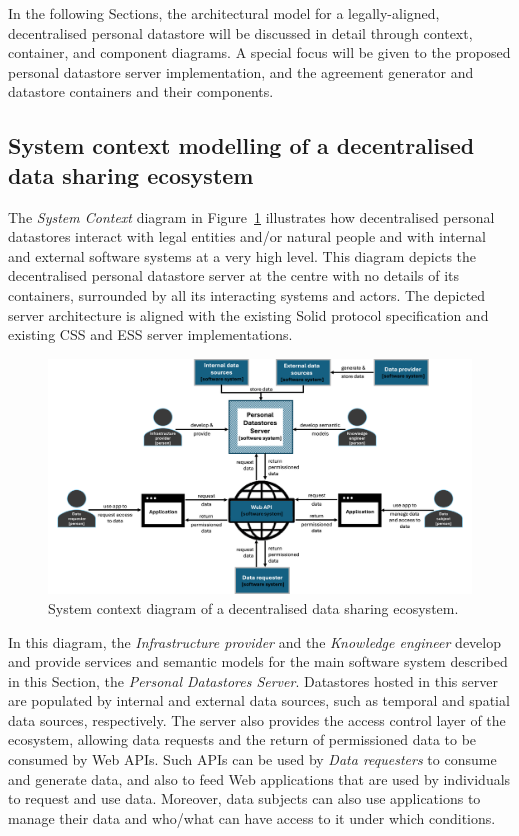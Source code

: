 In the following Sections, the architectural model for a legally-aligned, decentralised personal datastore will be discussed in detail through context, container, and component diagrams.
A special focus will be given to the proposed personal datastore server implementation, and the agreement generator and datastore containers and their components. 

\subsection{System context modelling of a decentralised data sharing ecosystem}
\label{sec:c4_context}

The \textit{System Context} diagram in Figure~\ref{fig:c4-context} illustrates how decentralised personal datastores interact with legal entities and/or natural people and with internal and external software systems at a very high level.
This diagram depicts the decentralised personal datastore server at the centre with no details of its containers, surrounded by all its interacting systems and actors.
The depicted server architecture is aligned with the existing Solid protocol specification \citep{capadisli_solid_2022} and existing CSS and ESS server implementations.

\begin{figure}[ht]
    \centering
    \includegraphics[width=1\linewidth]{figures//chapter-6/system-context-diagram.png}
    \caption{System context diagram of a decentralised data sharing ecosystem.}
    \label{fig:c4-context}
\end{figure}

In this diagram, the \textit{Infrastructure provider} and the \textit{Knowledge engineer} develop and provide services and semantic models for the main software system described in this Section, the \textit{Personal Datastores Server}.
Datastores hosted in this server are populated by internal and external data sources, such as temporal and spatial data sources, respectively.
The server also provides the access control layer of the ecosystem, allowing data requests and the return of permissioned data to be consumed by Web APIs.
Such APIs can be used by \textit{Data requesters} to consume and generate data, and also to feed Web applications that are used by individuals to request and use data.
Moreover, data subjects can also use applications to manage their data and who/what can have access to it under which conditions.

